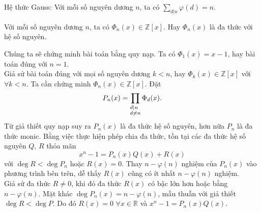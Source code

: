 \begin{hq}\label{hq2.2.3}
	Hệ thức Gauss: Với mỗi số nguyên dương $n$, ta có $\sum\limits_{d|n}\varphi(d)=n$.
\end{hq}
\begin{dl}\label{dl2.2.4}
	Với mỗi số nguyên dương $n$, ta có $\Phi _n(x)\in \mathbb{Z}[x]$. Hay $\Phi_n(x)$ là đa thức với hệ số nguyên.
\end{dl}
 Chúng ta sẽ chứng minh bài toán bằng quy nạp. Ta có $\Phi_1(x)=x-1$, hay bài toán đúng với $n=1$.\\
Giả sử bài toán đúng với mọi số nguyên dương $k<n$, hay $\Phi_k(x)\in \mathbb{Z}[x]$ với $\forall k<n$. Ta cần chứng minh $\Phi_n(x)\in \mathbb{Z}[x]$. Đặt
\begin{displaymath}
P_n(x)=\prod\limits_{\begin{subarray}{l}  d|n\\
	d\ne n
	\end{subarray}} \Phi _d(x).
\end{displaymath}
Từ giả thiết quy nạp suy ra $P_n(x)$ là đa thức hệ số nguyên, hơn nữa $P_n$ là đa thức monic. Bằng việc thực hiện phép chia đa thức, tồn tại các đa thức hệ số nguyên $Q,\,R$ thỏa mãn
$$x^n-1=P_n(x)Q(x)+R(x)$$
với $\deg R< \deg P_n$ hoặc $R(x)=0$. Thay $n-\varphi(n)$ nghiệm của $P_n(x)$ vào phương trình bên trên, dễ thấy $R(x)$ cũng có ít nhất $n-\varphi(n)$ nghiệm.\\
Giả sử đa thức $R\ne 0$, khi đó đa thức $R(x)$ có bậc lớn hơn hoặc bằng $n-\varphi(n)$. Mặt khác $\deg P_n(x)=n-\varphi(n)$, mẫu thuẫn với giả thiết $\deg R<\deg P$. Do đó $R(x)=0$ $\forall x\in \mathbb{R}$ và $x^n-1=P_n(x)Q(x)$.

